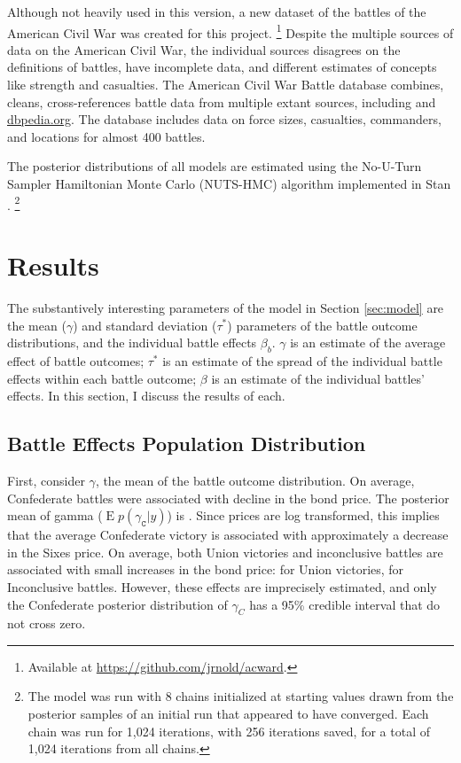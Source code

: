 \documentclass[11pt, oneside, article]{memoir}
\DeclareMathOperator{\E}{E}
\begin{document}
Although not heavily used in this version, a new dataset of the battles of the American Civil War was created for this project.%
\footnote{Available at \url{https://github.com/jrnold/acward}.}
Despite the multiple sources of data on the American Civil War, the individual sources disagrees on the definitions of battles, have incomplete data, and different estimates of concepts like strength and casualties.
The American Civil War Battle database combines, cleans, cross-references battle data from multiple extant sources, including \textcites{Phister1883}{Livermore1900}{Bodart1908}{dyer1908_war_rebel}{KennedyConservation1998}{CWSAC1993}{cwsac2012} and \href{http://dbpedia.org}{dbpedia.org}.
The database includes data on force sizes, casualties, commanders, and locations for almost 400 battles.

The posterior distributions of all models are estimated using the No-U-Turn Sampler Hamiltonian Monte Carlo (NUTS-HMC) algorithm implemented in \textsf{Stan} \parencites{Stan2013b}{HoffmanGelman2011}.%
\footnote{The model was run with 8 chains initialized at starting values drawn from the posterior samples of an initial run that appeared to have converged. 
Each chain was run for 1,024 iterations, with 256 iterations saved, for a total of 1,024 iterations from all chains.}

\section{Results}
\label{sec:results}

The substantively interesting parameters of the model in Section \ref{sec:model} are the mean ($\gamma$) and standard deviation ($\tau^*$) parameters of the battle outcome distributions, and the individual battle effects $\beta_{b}$.
$\gamma$ is an estimate of the average effect of battle outcomes;
$\tau^{*}$ is an estimate of the spread of the individual battle effects within each battle outcome;
$\beta$ is an estimate of the individual battles' effects.
In this section, I discuss the results of each.

\subsection{Battle Effects Population Distribution}
\label{sec:battle-results}

First, consider $\gamma$, the mean of the battle outcome distribution.
On average, Confederate battles were associated with decline in the bond price.
The posterior mean of gamma ($\E p(\gamma_{\mathtt{C}} | y)$) is \AcwGammaMeanC{}.
Since prices are log transformed, this implies that the average Confederate victory is associated with approximately a \AcwGammaMeanCPct{} decrease in the Sixes price.
On average, both Union victories and inconclusive battles are associated with small increases in the bond price:
\AcwGammaMeanUPct{} for Union victories, \AcwGammaMeanIPct{} for Inconclusive battles.
However, these effects are imprecisely estimated, and only the Confederate posterior distribution of $\gamma_{C}$ has a 95\% credible interval that do not cross zero.
\end{document}
